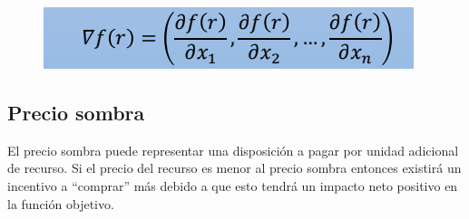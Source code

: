 \documentclass[conference]{IEEEtran}
\begin{document}
\begin{figure}[H]
    \begin{center}
        \includegraphics[width=\linewidth]{./Images/VectorGradiente.png}
        \caption{}
    \end{center}
\end{figure}

\subsection{Precio sombra}

El precio sombra puede representar una disposición a pagar por unidad 
adicional de recurso. Si el precio del recurso es menor al precio sombra 
entonces existirá un incentivo a ``comprar'' más debido a que esto tendrá un 
impacto neto positivo en la función objetivo.




\end{document}
